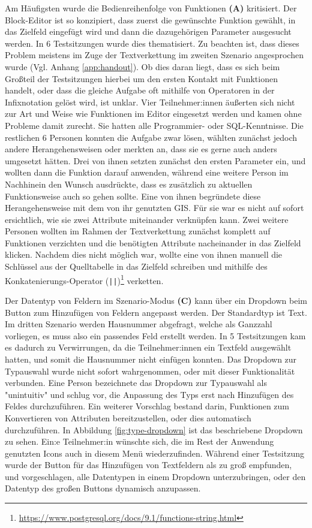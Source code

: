 Am Häufigsten wurde die Bedienreihenfolge von Funktionen \textbf{(A)} kritisiert. Der Block-Editor ist so konzipiert, dass zuerst die gewünschte Funktion gewählt, in das Zielfeld eingefügt wird und dann die dazugehörigen Parameter ausgesucht werden. In 6 Testsitzungen wurde dies thematisiert. Zu beachten ist, dass dieses Problem meistens im Zuge der Textverkettung im zweiten Szenario angesprochen wurde (Vgl. Anhang \ref{app:handout}). Ob dies daran liegt, dass es sich beim Großteil der Testsitzungen hierbei um den ersten Kontakt mit Funktionen handelt, oder dass die gleiche Aufgabe oft mithilfe von Operatoren in der Infixnotation gelöst wird, ist unklar. Vier Teilnehmer:innen äußerten sich nicht zur Art und Weise wie Funktionen im Editor eingesetzt werden und kamen ohne Probleme damit zurecht. Sie hatten alle Programmier- oder \ac{SQL}-Kenntnisse. Die restlichen 6 Personen konnten die Aufgabe zwar lösen, wählten zunächst jedoch andere Herangehensweisen oder merkten an, dass sie es gerne auch anders umgesetzt hätten. Drei von ihnen setzten zunächst den ersten Parameter ein, und wollten dann die Funktion darauf anwenden, während eine weitere Person im Nachhinein den Wunsch ausdrückte, dass es zusätzlich zu aktuellen Funktionsweise auch so gehen sollte. Eine von ihnen begründete diese Herangehensweise mit dem von ihr genutzten \ac{GIS}. Für sie war es nicht auf sofort ersichtlich, wie sie zwei Attribute miteinander verknüpfen kann. Zwei weitere Personen wollten im Rahmen der Textverkettung zunächst komplett auf Funktionen verzichten und die benötigten Attribute nacheinander in das Zielfeld klicken. Nachdem dies nicht möglich war, wollte eine von ihnen manuell die Schlüssel aus der Quelltabelle in das Zielfeld schreiben und mithilfe des Konkatenierungs-Operator (\texttt{||})\footnote{\url{https://www.postgresql.org/docs/9.1/functions-string.html}} verketten.

Der Datentyp von Feldern im Szenario-Modus \textbf{(C)} kann über ein Dropdown beim Button zum Hinzufügen von Feldern angepasst werden. Der Standardtyp ist Text. Im dritten Szenario werden Hausnummer abgefragt, welche als Ganzzahl vorliegen, es muss also ein passendes Feld erstellt werden. In 5 Testsitzungen kam es dadurch zu Verwirrungen, da die Teilnehmer:innen ein Textfeld ausgewählt hatten, und somit die Hausnummer nicht einfügen konnten. Das Dropdown zur Typauswahl wurde nicht sofort wahrgenommen, oder mit dieser Funktionalität verbunden. Eine Person bezeichnete das Dropdown zur Typauswahl als "unintuitiv" und schlug vor, die Anpassung des Typs erst nach Hinzufügen des Feldes durchzuführen. Ein weiterer Vorschlag bestand darin, Funktionen zum Konvertieren von Attributen bereitzustellen, oder dies automatisch durchzuführen. In Abbildung \ref{fig:type-dropdown} ist das beschriebene Dropdown zu sehen. Ein:e Teilnehmer:in wünschte sich, die im Rest der Anwendung genutzten Icons auch in diesem Menü wiederzufinden. Während einer Testsitzung wurde der Button für das Hinzufügen von Textfeldern als zu groß empfunden, und vorgeschlagen, alle Datentypen in einem Dropdown unterzubringen, oder den Datentyp des großen Buttons dynamisch anzupassen.

